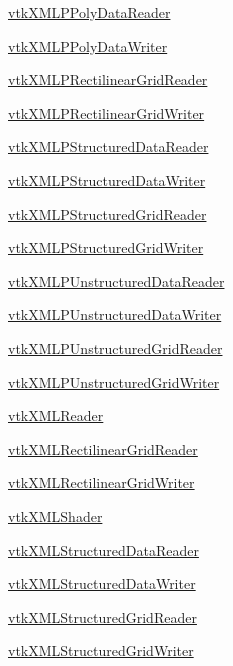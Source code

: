 \begin{DoxyItemize}
\item \hyperlink{vtkio_vtkxmlppolydatareader}{vtk\-X\-M\-L\-P\-Poly\-Data\-Reader}  
\item \hyperlink{vtkio_vtkxmlppolydatawriter}{vtk\-X\-M\-L\-P\-Poly\-Data\-Writer}  
\item \hyperlink{vtkio_vtkxmlprectilineargridreader}{vtk\-X\-M\-L\-P\-Rectilinear\-Grid\-Reader}  
\item \hyperlink{vtkio_vtkxmlprectilineargridwriter}{vtk\-X\-M\-L\-P\-Rectilinear\-Grid\-Writer}  
\item \hyperlink{vtkio_vtkxmlpstructureddatareader}{vtk\-X\-M\-L\-P\-Structured\-Data\-Reader}  
\item \hyperlink{vtkio_vtkxmlpstructureddatawriter}{vtk\-X\-M\-L\-P\-Structured\-Data\-Writer}  
\item \hyperlink{vtkio_vtkxmlpstructuredgridreader}{vtk\-X\-M\-L\-P\-Structured\-Grid\-Reader}  
\item \hyperlink{vtkio_vtkxmlpstructuredgridwriter}{vtk\-X\-M\-L\-P\-Structured\-Grid\-Writer}  
\item \hyperlink{vtkio_vtkxmlpunstructureddatareader}{vtk\-X\-M\-L\-P\-Unstructured\-Data\-Reader}  
\item \hyperlink{vtkio_vtkxmlpunstructureddatawriter}{vtk\-X\-M\-L\-P\-Unstructured\-Data\-Writer}  
\item \hyperlink{vtkio_vtkxmlpunstructuredgridreader}{vtk\-X\-M\-L\-P\-Unstructured\-Grid\-Reader}  
\item \hyperlink{vtkio_vtkxmlpunstructuredgridwriter}{vtk\-X\-M\-L\-P\-Unstructured\-Grid\-Writer}  
\item \hyperlink{vtkio_vtkxmlreader}{vtk\-X\-M\-L\-Reader}  
\item \hyperlink{vtkio_vtkxmlrectilineargridreader}{vtk\-X\-M\-L\-Rectilinear\-Grid\-Reader}  
\item \hyperlink{vtkio_vtkxmlrectilineargridwriter}{vtk\-X\-M\-L\-Rectilinear\-Grid\-Writer}  
\item \hyperlink{vtkio_vtkxmlshader}{vtk\-X\-M\-L\-Shader}  
\item \hyperlink{vtkio_vtkxmlstructureddatareader}{vtk\-X\-M\-L\-Structured\-Data\-Reader}  
\item \hyperlink{vtkio_vtkxmlstructureddatawriter}{vtk\-X\-M\-L\-Structured\-Data\-Writer}  
\item \hyperlink{vtkio_vtkxmlstructuredgridreader}{vtk\-X\-M\-L\-Structured\-Grid\-Reader}  
\item \hyperlink{vtkio_vtkxmlstructuredgridwriter}{vtk\-X\-M\-L\-Structured\-Grid\-Writer}  

\end{DoxyItemize}
